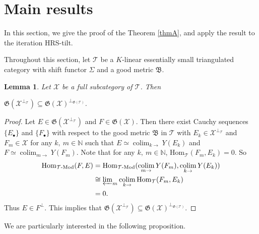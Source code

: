 \documentclass[11pt,a4paper]{amsart}
\numberwithin{equation}{section} \theoremstyle{plain}
\newtheorem{lem}{Lemma}[section]
\numberwithin{equation}{section} \theoremstyle{definition}
\begin{document}
\bigskip
\section{\bf Main results}
In this section, we give the proof of the Theorem \ref{thmA}, and apply the result to the iteration HRS-tilt.


Throughout this section, let $\mathcal{T}$ be a $K$-linear essentially small triangulated category with shift functor $\Sigma$ and a good metric $\mathfrak{B}$.

\begin{lem}\label{lem0} Let $\mathcal{X}$ be a full subcategory of $\mathcal{T}$. Then
\begin{center}
$\mathfrak{G}(\mathcal{X}^{\perp_{\mathcal{T}}})\subseteq\mathfrak{G}(\mathcal{X})^{\perp_{\mathfrak{G}(\mathcal{T})}}$.
\end{center}
\end{lem}
\begin{proof} Let $E\in\mathfrak{G}(\mathcal{X}^{\perp_{\mathcal{T}}})$ and $F\in\mathfrak{G}(\mathcal{X})$. Then there exist Cauchy sequences $\{E_{\bullet}\}$ and $\{F_{\bullet}\}$ with respect to the good metric $\mathfrak{B}$ in $\mathcal{T}$ with $E_{k}\in\mathcal{X}^{\perp_{\mathcal{T}}}$ and $F_{m}\in\mathcal{X}$ for any $k,~m\in\mathbb{N}$ such that $E\simeq\displaystyle\operatorname*{colim}_{k\to}Y(E_{k})$ and $F\simeq\displaystyle\operatorname*{colim}_{m\to}Y(F_{m})$. Note that for any $k,~m\in\mathbb{N}$, $\mathrm{Hom}_{\mathcal{T}}(F_{m},E_{k})=0$. So
\begin{align*}
{\rm Hom}_{\mathcal{T}\text{-Mod}}(F, E)
& = {\rm Hom}_{\mathcal{T}\text{-Mod}}(\displaystyle\operatorname*{colim}_{m\to}Y(F_{m}),\displaystyle\operatorname*{colim}_{k\to}Y(E_{k})) \\
&\cong \varprojlim\nolimits_{m }\displaystyle\operatorname*{colim}_{k\to}{\rm Hom}_{\mathcal{T}}(F_{m}, E_{k})\\
&= 0.
\end{align*}Thus $E\in F^{\perp}$. This implies that $\mathfrak{G}(\mathcal{X}^{\perp_{\mathcal{T}}})\subseteq\mathfrak{G}(\mathcal{X})^{\perp_{\mathfrak{G}(\mathcal{T})}}$.
\end{proof}

We are particularly interested in the following proposition.
\end{document}
